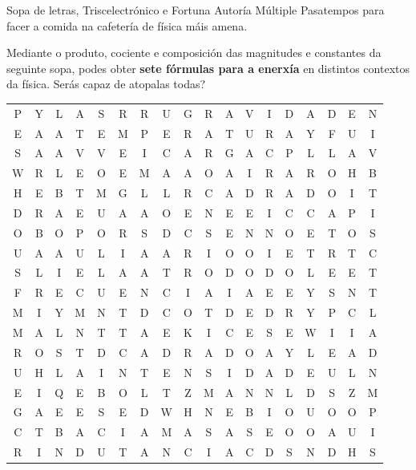 \Artigo*%
{pasatempos}%
{Sopa de letras, Triscelectrónico e Fortuna}%
{Autoría Múltiple}%
{Pasatempos para facer a comida na cafetería de física máis amena.}%


Mediante o produto, cociente e composición das magnitudes e constantes da
seguinte sopa, podes obter \textbf{sete fórmulas para a enerxía} en distintos
contextos da física. Serás capaz de atopalas todas?

\vspace{2em}

{
\renewcommand{\arraystretch}{1.3} %
\setlength{\tabcolsep}{3pt}
\begin{table}[H]
    \fontsize{15pt}{15pt}\selectfont%
    \centering
    \begin{tabular}{cccccccccccccccccc}
        P & Y & L & A & S & R & R & U & G & R & A & V & I & D & A & D & E & N \\
        E & A & A & T & E & M & P & E & R & A & T & U & R & A & Y & F & U & I \\
        S & A & A & V & V & E & I & C & A & R & G & A & C & P & L & L & A & V \\
        W & R & L & E & O & E & M & A & A & O & A & I & R & A & R & O & H & B \\
        H & E & B & T & M & G & L & L & R & C & A & D & R & A & D & O & I & T \\
        D & R & A & E & U & A & A & O & E & N & E & E & I & C & C & A & P & I \\
        O & B & O & P & O & R & S & D & C & S & E & N & N & O & E & T & O & S \\
        U & A & A & U & L & I & A & A & R & I & O & O & I & E & T & R & T & C \\
        S & L & I & E & L & A & A & T & R & O & D & O & D & O & L & E & E & T \\
        F & R & E & C & U & E & N & C & I & A & I & A & E & E & Y & S & N & T \\
        M & I & Y & M & N & T & D & C & O & T & D & E & D & R & Y & P & C & L \\
        M & A & L & N & T & T & A & E & K & I & C & E & S & E & W & I & I & A \\
        R & O & S & T & D & C & A & D & R & A & D & O & A & Y & L & E & A & D \\
        U & H & L & A & I & N & T & E & N & S & I & D & A & D & E & U & L & N \\
        E & I & Q & E & B & O & L & T & Z & M & A & N & N & L & D & S & Z & M \\
        G & A & E & E & S & E & D & W & H & N & E & B & I & O & U & O & O & P \\
        C & T & B & A & C & I & A & M & A & S & A & S & E & O & O & A & U & I \\
        R & I & N & D & U & T & A & N & C & I & A & C & D & S & N & D & H & S \\
    \end{tabular}
\end{table}
}


